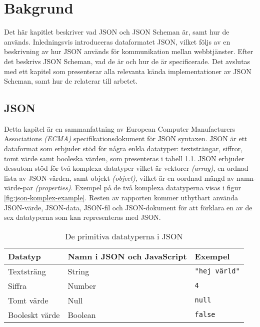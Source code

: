 \chapter{Bakgrund}
\label{sec:teori}
Det här kapitlet beskriver vad JSON och JSON Scheman är, samt hur de används. Inledningsvis introduceras dataformatet JSON, vilket följs av en beskrivning av hur JSON används för kommunikation mellan webbtjänster. Efter det beskrivs JSON Scheman, vad de är och hur de är specificerade. Det avslutas med ett kapitel som presenterar alla relevanta kända implementationer av JSON Scheman, samt hur de relaterar till arbetet.

\section{JSON}
\label{sec:teori:json}
Detta kapitel är en sammanfattning av European Computer Manufacturers Associations \textit{(ECMA)} specifikationsdokument för JSON syntaxen. JSON är ett dataformat som erbjuder stöd för några enkla datatyper: textsträngar, siffror, tomt värde samt booleska värden, som presenteras i tabell \ref{tab:json-primitives}. JSON erbjuder dessutom stöd för två komplexa datatyper vilket är vektorer \textit{(array)}, en ordnad lista av JSON-värden, samt objekt \textit{(object)}, vilket är en oordnad mängd av namn-värde-par \textit{(properties)}. Exempel på de två komplexa datatyperna visas i figur \ref{fig:json-komplex-example}. Resten av rapporten kommer utbytbart använda JSON-värde, JSON-data, JSON-fil och JSON-dokument för att förklara en av de sex datatyperna som kan representeras med JSON. \cite{ECMA2013}

\begin{table}
	\centering
	\caption{De primitiva datatyperna i JSON}
	\label{tab:json-primitives}
	\begin{tabular}{ | l | l | l | }
		\hline
		Datatyp & Namn i JSON och JavaScript & Exempel \\
		\hline
		Textsträng & String & \texttt{"hej värld"} \\
		\hline
		Siffra & Number & \texttt{4} \\
		\hline
		Tomt värde & Null & \texttt{null} \\
		\hline
		Booleskt värde & Boolean & \texttt{false} \\
		\hline
	\end{tabular}
\end{table}


